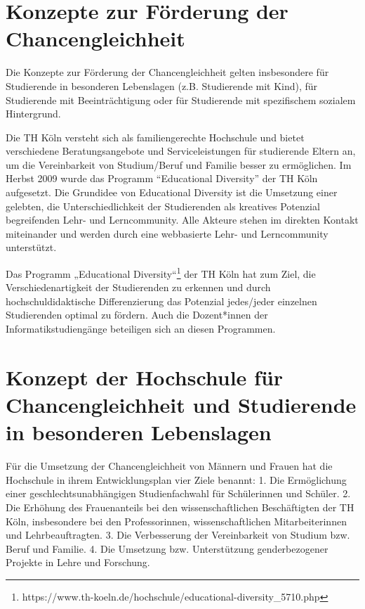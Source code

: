 \section{Konzepte zur Förderung der
Chancengleichheit}\label{konzepte-zur-fuxf6rderung-der-chancengleichheit}

Die Konzepte zur Förderung der Chancengleichheit gelten insbesondere für
Studierende in besonderen Lebenslagen (z.B. Studierende mit Kind), für
Studierende mit Beeinträchtigung oder für Studierende mit spezifischem
sozialem Hintergrund.

Die TH Köln versteht sich als familiengerechte Hochschule und bietet
verschiedene Beratungsangebote und Serviceleistungen für studierende
Eltern an, um die Vereinbarkeit von Studium/Beruf und Familie besser zu
ermöglichen. Im Herbst 2009 wurde das Programm ``Educational Diversity''
der TH Köln aufgesetzt. Die Grundidee von Educational Diversity ist die
Umsetzung einer gelebten, die Unterschiedlichkeit der Studierenden als
kreatives Potenzial begreifenden Lehr- und Lerncommunity. Alle Akteure
stehen im direkten Kontakt miteinander und werden durch eine webbasierte
Lehr- und Lerncommunity unterstützt.

Das Programm „Educational Diversity``\footnote{https://www.th-koeln.de/hochschule/educational-diversity\_5710.php}
der TH Köln hat zum Ziel, die Verschiedenartigkeit der Studierenden zu
erkennen und durch hochschuldidaktische Differenzierung das Potenzial
jedes/jeder einzelnen Studierenden optimal zu fördern. Auch die
Dozent*innen der Informatikstudiengänge beteiligen sich an diesen
Programmen.

\section{Konzept der Hochschule für Chancengleichheit und Studierende
in besonderen
Lebenslagen}\label{konzept-der-hochschule-fuxfcr-chancengleichheit-und-studierende-in-besonderen-lebenslagen}

Für die Umsetzung der Chancengleichheit von Männern und Frauen hat die
Hochschule in ihrem Entwicklungsplan vier Ziele benannt: 1. Die
Ermöglichung einer geschlechtsunabhängigen Studienfachwahl für
Schülerinnen und Schüler. 2. Die Erhöhung des Frauenanteils bei den
wissenschaftlichen Beschäftigten der TH Köln, insbesondere bei den
Professorinnen, wissenschaftlichen Mitarbeiterinnen und
Lehrbeauftragten. 3. Die Verbesserung der Vereinbarkeit von Studium bzw.
Beruf und Familie. 4. Die Umsetzung bzw. Unterstützung genderbezogener
Projekte in Lehre und Forschung.

